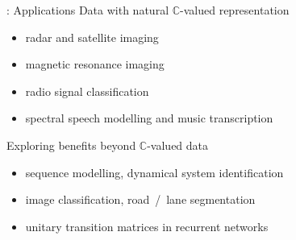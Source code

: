 \documentclass[handout]{beamer}
\newcommand{\cplx}{\mathbb{C}}
\begin{document}
\begin{frame}[c]{\insertsection: Applications}
  Data with natural $\cplx$-valued representation
  \begin{itemize}
    \item radar and satellite imaging\textsuperscript{
        \citep{hirose_complex-valued_2009,hansch_complex-valued_2010,zhang_complex-valued_2017}}

    \smallskip
    \item magnetic resonance imaging\textsuperscript{
        \citep{hui_mri_1995,wang_deepcomplexmri_2020}}

    \smallskip
    \item radio signal classification\textsuperscript{
        \citep{yang_complex_2019,tarver_design_2019}}

    \smallskip
    \item spectral speech modelling and music transcription\textsuperscript{
        \citep{wisdom_full-capacity_2016,trabelsi_deep_2018,yang_complex_2019}}
  \end{itemize}

  \pause
  \medskip
  Exploring benefits beyond $\cplx$-valued data
  \begin{itemize}
    \item sequence modelling, dynamical system identification\textsuperscript{
        \citep{danihelka_associative_2016,wisdom_full-capacity_2016}}

    \smallskip
    \item image classification, road~/~lane segmentation\textsuperscript{  %
        \citep{popa_complex-valued_2017,trabelsi_deep_2018,gaudet_deep_2018}}

    \smallskip
    \item unitary transition matrices in recurrent networks\textsuperscript{
        \citep{arjovsky_unitary_2016,wisdom_full-capacity_2016}}
  \end{itemize}

\end{frame}
\end{document}
